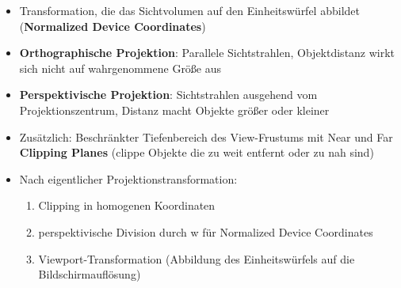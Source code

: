 \begin{itemize}
	\item Transformation, die das Sichtvolumen auf den Einheitswürfel abbildet (\textbf{Normalized Device Coordinates})
	\item \textbf{Orthographische Projektion}: Parallele Sichtstrahlen, Objektdistanz wirkt sich nicht auf wahrgenommene Größe aus
	\item \textbf{Perspektivische Projektion}: Sichtstrahlen ausgehend vom Projektionszentrum, Distanz macht Objekte größer oder kleiner
	\item Zusätzlich: Beschränkter Tiefenbereich des View-Frustums mit Near und Far \textbf{Clipping Planes} (clippe Objekte die zu weit entfernt oder zu nah sind)
	\item Nach eigentlicher Projektionstransformation:
	\begin{enumerate}
		\item Clipping in homogenen Koordinaten
		\item perspektivische Division durch w für Normalized Device Coordinates
		\item Viewport-Transformation (Abbildung des Einheitswürfels auf die Bildschirmauflösung)
	\end{enumerate}
\end{itemize}